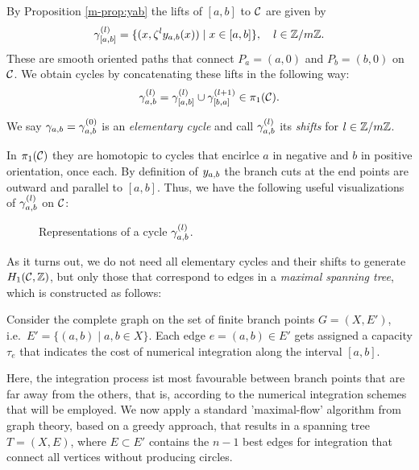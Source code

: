 \documentclass[main.tex]{subfiles}
\begin{document}
   By Proposition \ref{m-prop:yab} the lifts of $[a,b]$ to $\mathcal{C}$ are given by
   \begin{equation}\label{eq:def_path_ab}
      \gamma^{(l)}_{[a,b]} = \{  (x,\zeta^l y_{a,b}(x))  \mid  x \in [a,b]  \}, \quad l \in \mathbb{Z}/m\mathbb{Z}.
   \end{equation}
   These are smooth oriented paths that connect $P_a = (a,0)$ and $P_b = (b,0)$ on $\mathcal{C}$. We obtain cycles by concatenating these lifts in the following way:
    \begin{equation}\label{eq:def_cyabl}
      \gamma_{a,b}^{(l)} = \gamma^{(l)}_{[a,b]} \cup \gamma^{(l+1)}_{[b,a]} \in \pi_1(\mathcal{C}).
   \end{equation}
   \begin{defn}\label{def:elem_cycles}
       We say $\gamma_{a,b} = \gamma_{a,b}^{(0)}$ is an \emph{elementary cycle} and call $\gamma_{a,b}^{(l)}$ its \emph{shifts} for $l \in \mathbb{Z}/m\mathbb{Z}$.
   \end{defn}
   In $\pi_1(\mathcal{C})$
   they are homotopic to cycles that encirlce  $a$ in negative and $b$ in positive orientation, once each.
   By definition of $y_{a,b}$ the branch cuts at the end points are outward and parallel to $[a,b]$. Thus, we have the following useful visualizations of $\gamma_{a,b}^{(l)}$ on $\mathcal{C}$:
   \begin{figure}[H]
      \begin{center}
   
      \end{center}
    \caption{Representations of a cycle $\gamma_{a,b}^{(l)}$.}
    \label{fig:elem_cycle}
\end{figure}

  \bigskip

  As it turns out, we do not need all elementary cycles and their shifts to generate $H_1(\mathcal{C},\mathbb{Z})$, but only those that correspond to edges in a \emph{maximal spanning tree}, which is constructed
  as follows: 
  
  \medskip
   Consider the complete graph on the set of finite branch points $G = (X,E')$, i.e.\ $E' = \{  (a,b)  \mid  a,b \in X \}$.
   Each edge $e = (a,b) \in E'$ gets assigned a capacity $\tau_e$ that indicates the cost of numerical integration along the interval $[a,b]$.
   
    \medskip
   Here, the integration process ist most favourable
   between branch points that are far away from the others, that is, according to the
   numerical integration schemes that will be employed. \abstand
   We now apply a standard 'maximal-flow' algorithm from graph theory, based on a greedy approach, that results in a spanning tree $T = (X,E)$, where $E \subset E'$ contains the $n-1$ best edges
   for integration that connect all vertices without producing circles.
\end{document}
